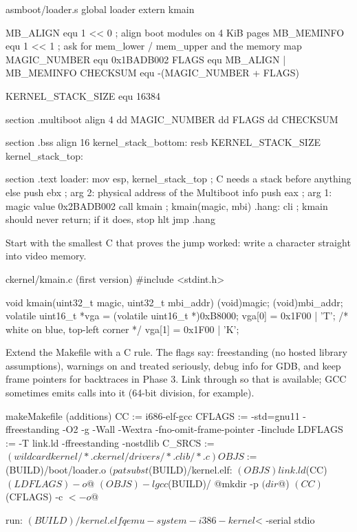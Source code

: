 \documentclass[11pt,a4paper]{article}
\begin{document}
\begin{lst}{asm}{boot/loader.s}
global loader
extern kmain

MB_ALIGN     equ 1 << 0                ; align boot modules on 4 KiB pages
MB_MEMINFO   equ 1 << 1                ; ask for mem_lower / mem_upper and the memory map
MAGIC_NUMBER equ 0x1BADB002
FLAGS        equ MB_ALIGN | MB_MEMINFO
CHECKSUM     equ -(MAGIC_NUMBER + FLAGS)

KERNEL_STACK_SIZE equ 16384

section .multiboot
align 4
    dd MAGIC_NUMBER
    dd FLAGS
    dd CHECKSUM

section .bss
align 16
kernel_stack_bottom:
    resb KERNEL_STACK_SIZE
kernel_stack_top:

section .text
loader:
    mov  esp, kernel_stack_top ; C needs a stack before anything else
    push ebx                   ; arg 2: physical address of the Multiboot info
    push eax                   ; arg 1: magic value 0x2BADB002
    call kmain                 ; kmain(magic, mbi)
.hang:
    cli                        ; kmain should never return; if it does, stop
    hlt
    jmp  .hang
\end{lst}

Start with the smallest C that proves the jump worked: write a character straight into video memory.

\begin{lst}{c}{kernel/kmain.c (first version)}
#include <stdint.h>

void kmain(uint32_t magic, uint32_t mbi_addr)
{
    (void)magic; (void)mbi_addr;
    volatile uint16_t *vga = (volatile uint16_t *)0xB8000;
    vga[0] = 0x1F00 | 'T';     /* white on blue, top-left corner */
    vga[1] = 0x1F00 | 'K';
}
\end{lst}

Extend the Makefile with a C rule. The flags say: freestanding (no hosted library assumptions), warnings on and
treated seriously, debug info for GDB, and keep frame pointers for backtraces in Phase 3. Link through  so
that  is available; GCC sometimes emits calls into it (64-bit division, for example).

\begin{lst}{make}{Makefile (additions)}
CC      := i686-elf-gcc
CFLAGS  := -std=gnu11 -ffreestanding -O2 -g -Wall -Wextra -fno-omit-frame-pointer -Iinclude
LDFLAGS := -T link.ld -ffreestanding -nostdlib
C_SRCS  := $(wildcard kernel/*.c kernel/drivers/*.c lib/*.c)
OBJS    := $(BUILD)/boot/loader.o $(patsubst %

$(BUILD)/kernel.elf: $(OBJS) link.ld
	$(CC) $(LDFLAGS) -o $@ $(OBJS) -lgcc

$(BUILD)/%
	@mkdir -p $(dir $@)
	$(CC) $(CFLAGS) -c $< -o $@

run: $(BUILD)/kernel.elf
	qemu-system-i386 -kernel $< -serial stdio
\end{lst}
\end{document}

